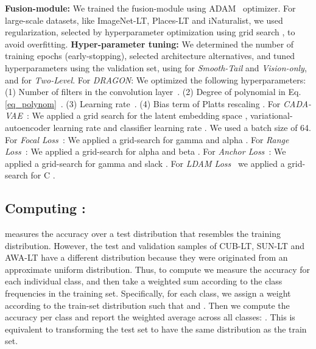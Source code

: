 \documentclass[10pt,twocolumn,letterpaper]{article}
\newcommand{\SmoothTail}{Smooth-Tail}
\newcommand{\TwoLevel}{Two-Level}
\begin{document}
\noindent\textbf{Fusion-module:}
We trained the fusion-module using ADAM~\cite{Adam} optimizer. For large-scale datasets, like ImageNet-LT, Places-LT and iNaturalist, we used  regularization, selected by hyperparameter optimization using grid search , to avoid overfitting.
\noindent\textbf{Hyper-parameter tuning:}
We determined the number of training epochs (early-stopping), selected architecture alternatives, and tuned hyperparameters using the validation set, using  for\textit{ \SmoothTail{}} and \textit{Vision-only}, and  for \textit{\TwoLevel{}}.
\newline For \textit{DRAGON}: 
We optimized the following hyperparameters: (1) Number of filters in the convolution layer~. (2) Degree of polynomial in Eq.\ref{eq_polynom}~. (3) Learning rate~. (4) Bias term of Platts rescaling .
\newline\noindent For \textit{CADA-VAE~\cite{Schnfeld2019GeneralizedZL}}: We applied a grid search for the latent embedding space , variational-autoencoder learning rate  and classifier learning rate . We used a batch size of 64.
\newline\noindent For \textit{Focal Loss~\cite{Lin2017FocalLF}}: We applied a grid-search for gamma  and alpha .
\newline\noindent For \textit{Range Loss~\cite{Lin2017FocalLF}}: We applied a grid-search for alpha  and beta .
\newline\noindent For \textit{Anchor Loss~\cite{Lin2017FocalLF}}: We applied a grid-search for gamma  and slack .
\newline\noindent For \textit{LDAM Loss~\cite{Lin2017FocalLF}} we applied a grid-search for C .











\subsection{Computing :} 
\label{appendix:long-tail-eval}
 measures the accuracy over a test distribution that resembles the training distribution. However, the test and validation samples of CUB-LT, SUN-LT and AWA-LT have a different distribution because they were originated from an approximate uniform distribution. Thus, to compute  we measure the accuracy for each individual class, and then take a weighted sum according to the class frequencies in the training set. Specifically, for each class, we assign a weight  according to the train-set distribution such that  and . Then we compute the accuracy per class and report the weighted average across all classes: . This is equivalent to transforming the test set to have the same distribution as the train set.
\end{document}
